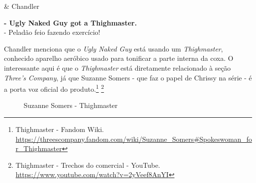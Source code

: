 \begin{tcolorbox}[enhanced,center upper,
    drop fuzzy shadow southeast, boxrule=0.3pt,
    lower separated=false, breakable,
    colframe=black!30!dialogoBorder,colback=white]
\begin{minipage}[c]{0.16\linewidth}
   & \centering \scriptsize{Chandler}
\end{minipage}
\hfill
\begin{minipage}[c]{0.8\linewidth}
  \textbf{- Ugly Naked Guy got a Thighmaster.}\\
  - Peladão feio fazendo exercício!
\end{minipage}
\end{tcolorbox}

\saveparinfos
\noindent
\begin{minipage}[c]{0.5\textwidth}\useparinfo

Chandler menciona que o \emph{Ugly Naked Guy} está usando um
\emph{Thighmaster}, conhecido aparelho aeróbico usado para tonificar a
parte interna da coxa. O interessante aqui é que o \emph{Thighmaster}
está diretamente relacionado à seção \emph{Three's Company}, já que
Suzanne Somers - que faz o papel de Chrissy na série - é a porta voz
oficial do produto.\footnote{\sloppy Thighmaster - Fandom Wiki. \url{https://threescompany.fandom.com/wiki/Suzanne_Somers#Spokeswoman_for_Thighmaster}}
\footnote{\sloppy Thighmaster - Trechos do comercial - YouTube. \url{https://www.youtube.com/watch?v=2yVeef8AnYI}}

\end{minipage}\hfill
\begin{minipage}[c]{0.45\textwidth}

\begin{figure}
  \centering
    \caption{Suzanne Somers - Thighmaster\label{fig:suzanne-somers-thighmaster}}
\end{figure}

\end{minipage}

